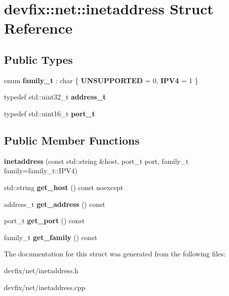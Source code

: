 \hypertarget{structdevfix_1_1net_1_1inetaddress}{}\section{devfix\+:\+:net\+:\+:inetaddress Struct Reference}
\label{structdevfix_1_1net_1_1inetaddress}
\subsection*{Public Types}
\begin{DoxyCompactItemize}
\item 
\mbox{\label{structdevfix_1_1net_1_1inetaddress_a1c470962b4c9c675d475dba2344b50f4}} 
enum {\bfseries family\+\_\+t} \+: char \{ {\bfseries U\+N\+S\+U\+P\+P\+O\+R\+T\+ED} = 0, 
{\bfseries I\+P\+V4} = 1
 \}
\item 
\mbox{\label{structdevfix_1_1net_1_1inetaddress_a2eb252de4b894131be8fcda68118bd77}} 
typedef std\+::uint32\+\_\+t {\bfseries address\+\_\+t}
\item 
\mbox{\label{structdevfix_1_1net_1_1inetaddress_a3eaadc730f2b4625987cf948ea485410}} 
typedef std\+::uint16\+\_\+t {\bfseries port\+\_\+t}
\end{DoxyCompactItemize}
\subsection*{Public Member Functions}
\begin{DoxyCompactItemize}
\item 
\mbox{\label{structdevfix_1_1net_1_1inetaddress_a2b5fb7c7cb63230d6188c74d90e323dc}} 
{\bfseries inetaddress} (const std\+::string \&host, port\+\_\+t port, family\+\_\+t family=family\+\_\+t\+::\+I\+P\+V4)
\item 
\mbox{\label{structdevfix_1_1net_1_1inetaddress_a4524692fae7a767e38600012c6f8f3cf}} 
std\+::string {\bfseries get\+\_\+host} () const noexcept
\item 
\mbox{\label{structdevfix_1_1net_1_1inetaddress_a8c606f2398a2d3c9436c4932d6c590b2}} 
address\+\_\+t {\bfseries get\+\_\+address} () const
\item 
\mbox{\label{structdevfix_1_1net_1_1inetaddress_ad2c4af8ffc473aebc58bc1bbe0277e7d}} 
port\+\_\+t {\bfseries get\+\_\+port} () const
\item 
\mbox{\label{structdevfix_1_1net_1_1inetaddress_a254e4950de6c6443a39196c6c7f58db4}} 
family\+\_\+t {\bfseries get\+\_\+family} () const
\end{DoxyCompactItemize}


The documentation for this struct was generated from the following files\+:\begin{DoxyCompactItemize}
\item 
devfix/net/inetaddress.\+h\item 
devfix/net/inetaddress.\+cpp\end{DoxyCompactItemize}
